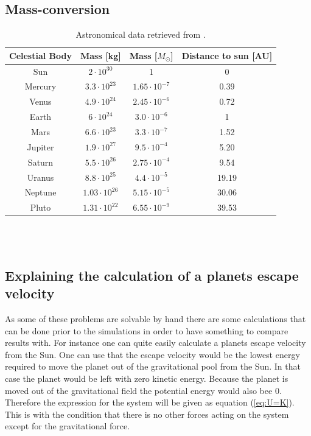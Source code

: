 \documentclass{article}
\begin{document}
\subsection{Mass-conversion} \label{app:mass}

    \begin{table}[H]
        \centering
        \caption{Astronomical data retrieved from \cite{solarsystemdata}. }
        \vspace{2mm}
        \label{tab:mass}
        \begin{tabular}{|c|c|c|c|}
            \hline
            Celestial Body & Mass [kg] & Mass [$M_{\odot}$] & Distance to sun [AU]\\
            \hline \hline
            Sun     & $ 2    \cdot10^{30} $ & 1                    & 0 \\
            Mercury & $ 3.3  \cdot10^{23} $ & $1.65 \cdot 10^{-7}$ & 0.39 \\
            Venus   & $ 4.9  \cdot10^{24} $ & $2.45 \cdot 10^{-6}$ & 0.72 \\
            Earth   & $ 6    \cdot10^{24} $ & $3.0 \cdot 10^{-6}$  & 1 \\
            Mars    & $ 6.6  \cdot10^{23} $ & $3.3 \cdot 10^{-7}$  & 1.52 \\
            Jupiter & $ 1.9  \cdot10^{27} $ & $9.5 \cdot 10^{-4}$  & 5.20 \\
            Saturn  & $ 5.5  \cdot10^{26} $ & $2.75 \cdot 10^{-4}$ & 9.54 \\
            Uranus  & $ 8.8  \cdot10^{25} $ & $4.4 \cdot 10^{-5}$  & 19.19 \\
            Neptune & $ 1.03 \cdot10^{26} $ & $5.15 \cdot 10^{-5}$ & 30.06 \\
            Pluto   & $ 1.31 \cdot10^{22} $ & $6.55 \cdot 10^{-9}$ & 39.53 \\
            \hline
        \end{tabular} \\
        \hspace{0pt}\\
    \end{table}

\subsection{Explaining the calculation of a planets escape velocity} \label{sec:escapevelocity}

    As some of these problems are solvable by hand there are some calculations that can be done prior to the simulations in order to have something to compare results with. For instance one can quite easily calculate a planets escape velocity from the Sun. One can use that the escape velocity would be the lowest energy required to move the planet out of the gravitational pool from the Sun. In that case the planet would be left with zero kinetic energy. Because the planet is moved out of the gravitational field the potential energy would also bee 0. Therefore the expression for the system will be given as equation (\ref{eq:U=K}). This is with the condition that there is no other forces acting on the system except for the gravitational force.   \\
\end{document}

